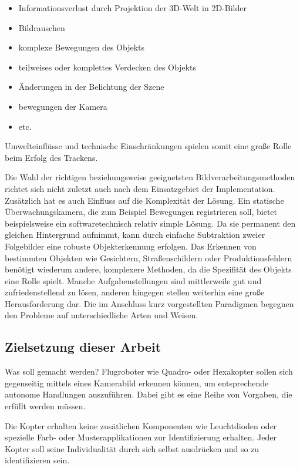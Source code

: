 \begin{itemize}
\item Informationsverlust durch Projektion der 3D-Welt in 2D-Bilder
\item Bildrauschen
\item komplexe Bewegungen des Objekts
\item teilweises oder komplettes Verdecken des Objekts
\item Änderungen in der Belichtung der Szene
\item bewegungen der Kamera
\item etc.
\end{itemize}

Umwelteinflüsse und technische Einschränkungen spielen somit eine große Rolle beim Erfolg des Trackens\cite{OTS}. 

Die Wahl der richtigen beziehungsweise geeignetsten Bildverarbeitungsmethoden richtet sich nicht zuletzt auch nach dem Einsatzgebiet der Implementation. Zusätzlich hat es auch Einfluss auf die Komplexität der Lösung. Ein statische Überwachungskamera, die zum Beispiel Bewegungen registrieren soll, bietet beispielsweise ein softwaretechnisch relativ simple Lösung. Da sie permanent den gleichen Hintergrund aufnimmt, kann durch einfache Subtraktion zweier Folgebilder eine robuste Objekterkennung erfolgen. Das Erkennen von bestimmten Objekten wie Gesichtern, Straßenschildern oder Produktionsfehlern benötigt wiederum andere, komplexere Methoden, da die Spezifität des Objekts eine Rolle spielt. Manche Aufgabenstellungen sind mittlerweile gut und zufriedenstellend zu lösen, anderen hingegen stellen weiterhin eine große Herausforderung dar. Die im Anschluss kurz vorgestellten Paradigmen begegnen den Probleme auf unterschiedliche Arten und Weisen.


\subsection{Zielsetzung dieser Arbeit}
Was soll gemacht werden?
Flugroboter wie Quadro- oder Hexakopter sollen sich gegenseitig mittels eines Kamerabild erkennen können, um entsprechende autonome Handlungen auszuführen. Dabei gibt es eine Reihe von Vorgaben, die erfüllt werden müssen.

Die Kopter erhalten keine zusätlichen Komponenten wie Leuchtdioden oder spezielle Farb- oder Musterapplikationen zur Identifizierung erhalten. Jeder Kopter soll seine Individualität durch sich selbst ausdrücken und so zu identifizieren sein.

